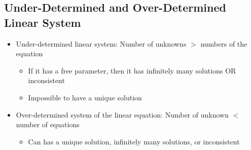 \documentclass[a4paper,12pt]{article}
\begin{document}
\subsection*{Under-Determined and Over-Determined Linear System}
\begin{itemize}
  \item Under-determined linear system: Number of unknowns \(>\) numbers of the equation
        \begin{itemize}
          \item If it has a free parameter, then it has infinitely many solutions OR inconsistent
          \item Impossible to have a unique solution
        \end{itemize}
  \item Over-determined system of the linear equation: Number of unknown \(<\) number of equations
        \begin{itemize}
          \item Can has a unique solution, infinitely many solutions, or inconsistent
        \end{itemize}
\end{itemize}
\end{document}

